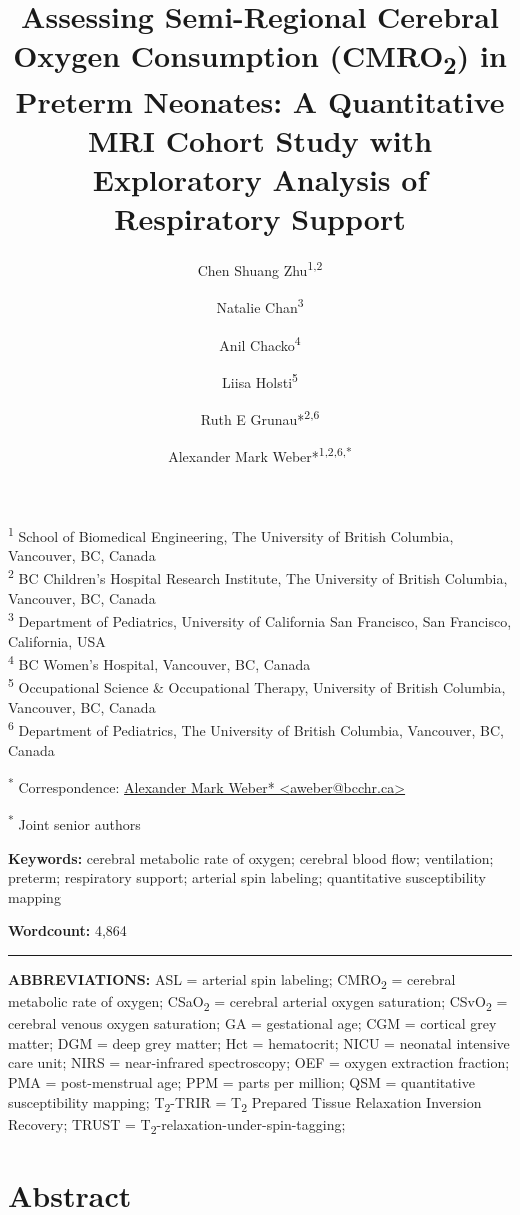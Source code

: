 \documentclass[
  letterpaper,
  DIV=11,
  numbers=noendperiod]{scrartcl}
\title{Assessing Semi-Regional Cerebral Oxygen Consumption
(CMRO\textsubscript{2}) in Preterm Neonates: A Quantitative MRI Cohort
Study with Exploratory Analysis of Respiratory Support}
\author{Chen Shuang Zhu\textsuperscript{1,2} \and Natalie
Chan\textsuperscript{3} \and Anil Chacko\textsuperscript{4} \and Liisa
Holsti\textsuperscript{5} \and Ruth E
Grunau*\textsuperscript{2,6} \and Alexander Mark
Weber*\textsuperscript{1,2,6,*}}
\date{}
\begin{document}
\maketitle


\textsuperscript{1} School of Biomedical Engineering, The University of
British Columbia, Vancouver, BC, Canada\\
\textsuperscript{2} BC Children's Hospital Research Institute, The
University of British Columbia, Vancouver, BC, Canada\\
\textsuperscript{3} Department of Pediatrics, University of California
San Francisco, San Francisco, California, USA\\
\textsuperscript{4} BC Women's Hospital, Vancouver, BC, Canada\\
\textsuperscript{5} Occupational Science \& Occupational Therapy,
University of British Columbia, Vancouver, BC, Canada\\
\textsuperscript{6} Department of Pediatrics, The University of British
Columbia, Vancouver, BC, Canada

\textsuperscript{*} Correspondence:
\href{mailto:aweber@bcchr.ca}{Alexander Mark Weber*
\textless{}aweber@bcchr.ca\textgreater{}}

\textsuperscript{*} Joint senior authors

\textbf{Keywords:} cerebral metabolic rate of oxygen; cerebral blood
flow; ventilation; preterm; respiratory support; arterial spin labeling;
quantitative susceptibility mapping

\textbf{Wordcount:} 4,864

\begin{center}\rule{0.5\linewidth}{0.5pt}\end{center}

\textbf{ABBREVIATIONS:} ASL = arterial spin labeling;
CMRO\textsubscript{2} = cerebral metabolic rate of oxygen;
CSaO\textsubscript{2} = cerebral arterial oxygen saturation;
CSvO\textsubscript{2} = cerebral venous oxygen saturation; GA =
gestational age; CGM = cortical grey matter; DGM = deep grey matter; Hct
= hematocrit; NICU = neonatal intensive care unit; NIRS = near-infrared
spectroscopy; OEF = oxygen extraction fraction; PMA = post-menstrual
age; PPM = parts per million; QSM = quantitative susceptibility mapping;
T\textsubscript{2}-TRIR = T\textsubscript{2} Prepared Tissue Relaxation
Inversion Recovery; TRUST =
T\textsubscript{2}-relaxation-under-spin-tagging;

\newpage{}

\section{\texorpdfstring{Abstract }{Abstract }}\label{abstract}
\end{document}
